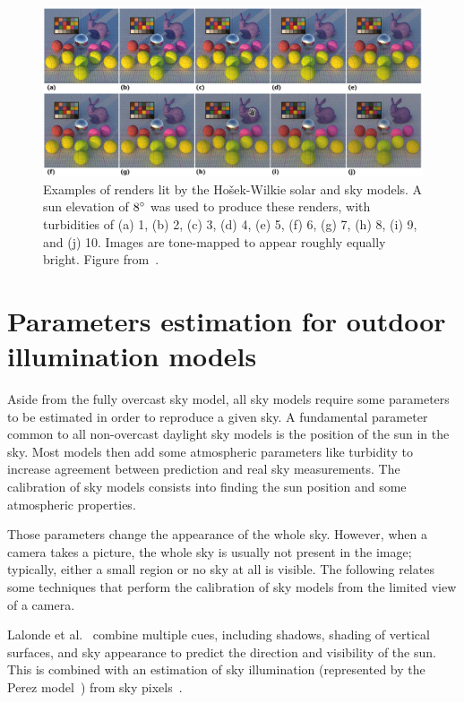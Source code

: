 \begin{figure}
\centering
\includegraphics[width=0.96\linewidth]{3rdparty/hwsun-renders.png}
\caption[Examples renders lit by the Ho\v{s}ek-Wilkie solar and sky models]{Examples of renders lit by the Ho\v{s}ek-Wilkie solar and sky models. A sun elevation of $8^{\circ}$ was used to produce these renders, with turbidities of (a) 1, (b) 2, (c) 3, (d) 4, (e) 5, (f) 6, (g) 7, (h) 8, (i) 9, and (j) 10. Images are tone-mapped to appear roughly equally bright. Figure from~\cite{hosek-siggraph-12}.}
\label{fig:hw_renders_model}
\end{figure}

\section{Parameters estimation for outdoor illumination models}

Aside from the fully overcast sky model, all sky models require some parameters to be estimated in order to reproduce a given sky. A fundamental parameter common to all non-overcast daylight sky models is the position of the sun in the sky. Most models then add some atmospheric parameters like turbidity to increase agreement between prediction and real sky measurements. The calibration of sky models consists into finding the sun position and some atmospheric properties. 

Those parameters change the appearance of the whole sky. However, when a camera takes a picture, the whole sky is usually not present in the image; typically, either a small region or no sky at all is visible. The following relates some techniques that perform the calibration of sky models from the limited view of a camera. 

Lalonde et al.~\cite{lalonde-ijcv-12} combine multiple cues, including shadows, shading of vertical surfaces, and sky appearance to predict the direction and visibility of the sun. This is combined with an estimation of sky illumination (represented by the Perez model~\cite{perez1993allweather}) from sky pixels~\cite{lalonde-ijcv-10}. 

